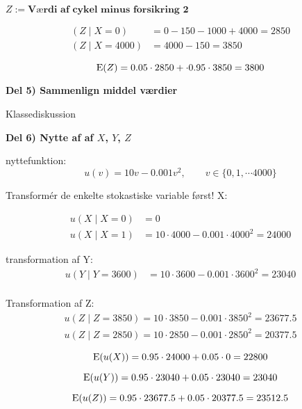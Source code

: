 $Z := \textbf{Værdi af cykel minus forsikring 2}$

\begin{align}
    (Z \mid X = 0) &= 0 - 150 - 1000 + 4000 = 2850 \\
    (Z \mid X = 4000) &= 4000 - 150 = 3850
\end{align}

\begin{equation}
    \text{E}(Z) = 0.05\cdot 2850 + \cdot 0.95 \cdot 3850 = 3800
\end{equation}

\textbf{Del 5) Sammenlign middel værdier}

Klassediskussion

\textbf{Del 6) Nytte af af $X$, $Y$, $Z$}

nyttefunktion:
\begin{equation}
    u(v) = 10 v - 0.001 v^2, \qquad v \in \{0, 1, \cdots 4000 \}
\end{equation}

Transformér de enkelte stokastiske variable først! X:

\begin{align}
    u(X \mid X = 0) &= 0  \\
    u(X \mid X = 1) &= 10\cdot 4000 - 0.001 \cdot 4000^2 = 24000
\end{align}

transformation af Y:
\begin{align}
    u(Y \mid Y = 3600) &= 10 \cdot 3600 - 0.001 \cdot 3600^2 = 23040\\
\end{align}
    
Transformation af Z:
\begin{align}
    u(Z \mid Z = 3850) = 10 \cdot 3850 - 0.001 \cdot 3850^2 = 23677.5\\
    u(Z \mid Z = 2850) = 10 \cdot 2850 - 0.001 \cdot 2850^2 = 20377.5  
\end{align}

\begin{equation}
    \text{E}(u(X)) = 0.95 \cdot 24000 + 0.05 \cdot 0 = 22800
\end{equation}

\begin{equation}
    \text{E}(u(Y)) = 0.95 \cdot 23040 +  0.05 \cdot 23040 = 23040
\end{equation}

\begin{equation}
    \text{E}(u(Z)) = 0.95 \cdot 23677.5 + 0.05 \cdot  20377.5  = 23512.5
\end{equation}

